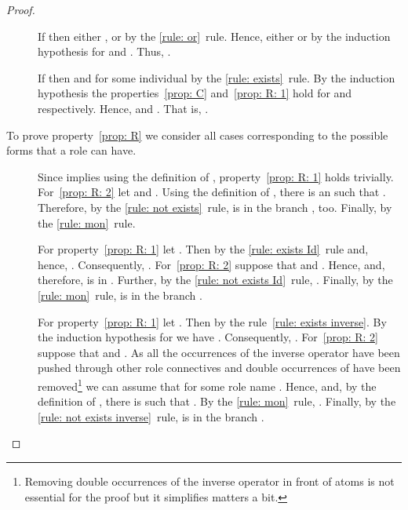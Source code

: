 \documentclass[leqno
,pdflatex
,prodmode
,acmtocl
]{acmsmall}
\begin{document}
\begin{proof}
\begin{description}
 \item[]
    If  then either , or 
    by the \eqref{rule: or}~rule.
    Hence, either  or  by the induction hypothesis for
     and .
    Thus, .
 \item[]
    If  then  and  
    for some individual  by the \eqref{rule: exists}~rule. 
    By the induction hypothesis the properties~\eqref{prop: C} and~\eqref{prop: R: 1} hold for 
    and  respectively. 
    Hence,
     and . That is, .
\end{description}
To prove property~\eqref{prop: R} we consider all cases corresponding to the possible forms that a role  can have.
\begin{description}
 \item[]
    Since  implies 
    using the definition of , property~\eqref{prop: R: 1} holds trivially.
    For~\eqref{prop: R: 2} let  and .
    Using the definition of , there is an  such that .
    Therefore, by the \eqref{rule: not exists}~rule,  is in the branch , too.
    Finally,  by the \eqref{rule: mon}~rule.
 \item[] For property~\eqref{prop: R: 1} let .
                    Then  by the \eqref{rule: exists Id}~rule and, hence, .
                    Consequently, .
For~\eqref{prop: R: 2} suppose that 
                     and .
                    Hence,  and, therefore,  is in .
                    Further, by the \eqref{rule: not exists Id}~rule,
                     .
                    Finally, by the \eqref{rule: mon}~rule, 
                     is in the branch .
 \item[] For property~\eqref{prop: R: 1} let .
                    Then  by the rule~\eqref{rule: exists inverse}.
                    By the induction hypothesis for  we have .
                    Consequently, .
For~\eqref{prop: R: 2} suppose that 
                     and .
                    As all the occurrences of the inverse operator have been pushed through other role connectives
                    and double occurrences
                    of  have been removed\footnote{Removing double occurrences of the inverse operator in front of atoms
                        is not essential for the proof but it simplifies matters a bit.}
                    we can assume that  for some role name .
                    Hence,  and, by the definition of ,
                    there is  such that .
                    By the \eqref{rule: mon}~rule, .
                    Finally, by the \eqref{rule: not exists inverse}~rule, 
                     is in the branch .
 \item[] 

\end{description}
\end{proof}
\end{document}
